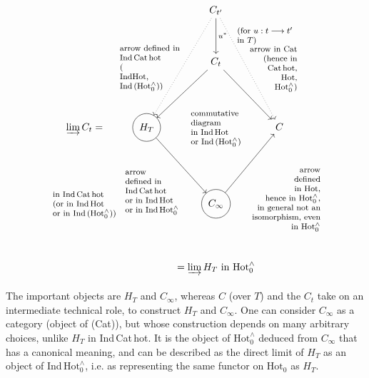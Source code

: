 \documentclass[11pt]{article}
\makeatletter
\newcommand{\printedpage}[1]{\marginpar{\footnotesize p.~#1}}
\newcommand{\msp}[1]{\marginpar{\footnotesize [#1]}}
\newcommand{\Hotz}{\mathrm{Hot}^{\wedge}_{0}}
\newcommand{\lab}[2][l]{\text{\footnotesize\begin{tabular}{@{}#1@{}}#2\end{tabular}}}
\makeatother
\begin{document}
\msp{page 114}
\printedpage{72}
\[
\begin{tikzcd}[column sep=small, row sep=huge]
 & & C_{t'} \arrow[d, "{u^{*}\quad\lab{(for $u : t \longrightarrow t'$\\ in $T$)}}"] \arrow[ldd, dotted] \arrow[rdd, dotted] & \\
 & & C_{t} \arrow[ld, swap, "{\lab{arrow defined in\\ Ind\,Cat\,hot\\ (\\ IndHot,\\ Ind\,($\Hotz$))}}"] \arrow[rd, "{\lab[r]{arrow in Cat\\ (hence in\\ Cat\,hot,\\ Hot,\\ $\Hotz$)}}"] & \\
\varinjlim C_{t} = & |[draw, circle]| H_{T} \arrow[rd, swap, "{\lab{arrow\\ defined in\\ Ind\,Cat\,hot\\ or in Ind\,Hot\\ or in Ind\,$\Hotz$}}"] & \lab{commutative\\ diagram\\ in Ind\,Hot\\ or Ind\,($\Hotz$)} & C \\
\lab{in Ind\,Cat\,hot\\ (or in Ind\,Hot\\ or in Ind\,($\Hotz$))} & & |[draw, circle]| C_{\infty} \arrow[ru, swap, "{\lab[r]{arrow\\ defined\\ in Hot,\\ hence in $\Hotz$,\\ in general not an\\ isomorphism, even\\ in $\Hotz$}}"] & \\
 & & = \varinjlim H_{T} \text{ in } \Hotz &
\end{tikzcd}
\]



The important objects are $H_{T}$ and $C_{\infty}$, whereas $C$ (over $T$) and the $C_{t}$ take on an intermediate technical role, to construct $H_{T}$ and $C_{\infty}$. One can consider $C_{\infty}$ as a category (object of (Cat)), but whose construction depends on many arbitrary choices, unlike $H_{T}$ in Ind\,Cat\,hot. It is the object of $\Hotz$ deduced from $C_{\infty}$ that has a canonical meaning, and can be described as the direct limit of $H_{T}$ as an object of Ind\,$\Hotz$, i.e. as representing the same functor on $\mathrm{Hot}_{0}$ as $H_{T}$.
\end{document}
